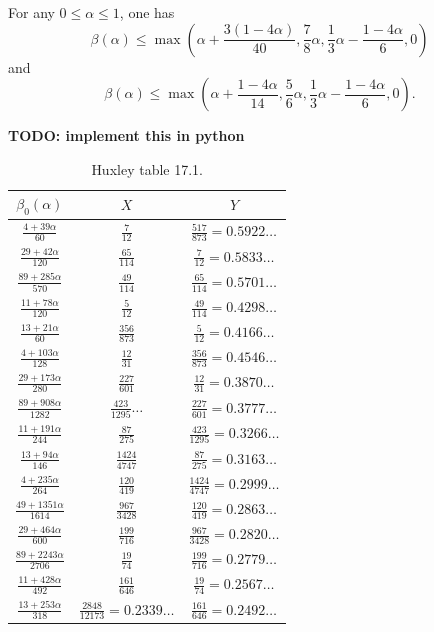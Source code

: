 \begin{theorem}\label{sargos_1995}\cite[Th\'eor\`eme 2.4, Lemme 2.6]{sargos_points_1995}  For any $0 \leq \alpha \leq 1$, one has
$$ \beta(\alpha) \leq \max(\alpha + \frac{3(1-4\alpha)}{40}, \frac{7}{8} \alpha, \frac{1}{3}\alpha - \frac{1-4\alpha}{6}, 0)$$
and
$$ \beta(\alpha) \leq \max(\alpha + \frac{1-4\alpha}{14}, \frac{5}{6} \alpha, \frac{1}{3}\alpha - \frac{1-4\alpha}{6}, 0).$$
\end{theorem}

{\bf TODO: implement this in python}

\begin{table}[ht]
    \caption{Huxley table 17.1.}
    \centering
    \renewcommand{\arraystretch}{1.2}
    \begin{tabular}{|c|c|c|}
    \hline
    $\beta_0(\alpha)$  & $X$ & $Y$ \\
    \hline
    $\frac{4+39\alpha}{60}$ & $\frac{7}{12}$ & $\frac{517}{873} = 0.5922\dots$ \\
    \hline
    $\frac{29+42\alpha}{120}$ & $\frac{65}{114}$ & $\frac{7}{12} = 0.5833\dots$ \\
    \hline
    $\frac{89+285\alpha}{570}$ & $\frac{49}{114}$ & $\frac{65}{114} = 0.5701\dots$ \\
    \hline
    $\frac{11+78\alpha}{120}$ & $\frac{5}{12}$ & $\frac{49}{114} = 0.4298\dots$ \\
    \hline
    $\frac{13+21\alpha}{60}$ & $\frac{356}{873}$ & $\frac{5}{12} = 0.4166\dots$ \\
    \hline
    $\frac{4+103\alpha}{128}$ & $\frac{12}{31}$ & $\frac{356}{873} = 0.4546\dots$ \\
    \hline
    $\frac{29+173\alpha}{280}$ & $\frac{227}{601}$ & $\frac{12}{31} = 0.3870\dots$ \\
    \hline
    $\frac{89+908\alpha}{1282}$ & $\frac{423}{1295}\dots$ & $\frac{227}{601} = 0.3777\dots$ \\
    \hline
    $\frac{11+191\alpha}{244}$ & $\frac{87}{275}$ & $\frac{423}{1295} = 0.3266\dots$ \\
    \hline
    $\frac{13+94\alpha}{146}$ & $\frac{1424}{4747}$ & $\frac{87}{275} = 0.3163\dots$\\
    \hline
    $\frac{4+235\alpha}{264}$ & $\frac{120}{419}$ & $\frac{1424}{4747}=0.2999\dots$ \\
    \hline
    $\frac{49+1351\alpha}{1614}$ & $\frac{967}{3428}$ & $\frac{120}{419} = 0.2863\dots$ \\
    \hline
    $\frac{29+464\alpha}{600}$ & $\frac{199}{716}$ & $\frac{967}{3428} = 0.2820\dots$ \\
    \hline
    $\frac{89+2243\alpha}{2706}$ & $\frac{19}{74}$ & $\frac{199}{716} = 0.2779\dots$ \\
    \hline
    $\frac{11+428\alpha}{492}$ & $\frac{161}{646}$ & $\frac{19}{74} = 0.2567\dots$ \\
    \hline
    $\frac{13+253\alpha}{318}$ & $\frac{2848}{12173} =0.2339\dots$ & $\frac{161}{646} = 0.2492\dots$ \\
    \hline
    \end{tabular}
    \end{table}\label{huxley-table-1}

